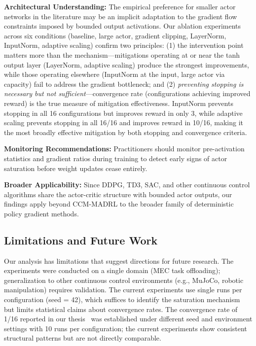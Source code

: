 \textbf{Architectural Understanding:} The empirical preference for smaller actor networks in the literature may be an implicit adaptation to the gradient flow constraints imposed by bounded output activations. Our ablation experiments across six conditions (baseline, large actor, gradient clipping, LayerNorm, InputNorm, adaptive scaling) confirm two principles: (1) the intervention point matters more than the mechanism---mitigations operating at or near the tanh output layer (LayerNorm, adaptive scaling) produce the strongest improvements, while those operating elsewhere (InputNorm at the input, large actor via capacity) fail to address the gradient bottleneck; and (2) \textit{preventing stopping is necessary but not sufficient}---convergence rate (configurations achieving improved reward) is the true measure of mitigation effectiveness. InputNorm prevents stopping in all 16 configurations but improves reward in only 3, while adaptive scaling prevents stopping in all 16/16 and improves reward in 10/16, making it the most broadly effective mitigation by both stopping and convergence criteria.

\textbf{Monitoring Recommendations:} Practitioners should monitor pre-activation statistics and gradient ratios during training to detect early signs of actor saturation before weight updates cease entirely.

\textbf{Broader Applicability:} Since DDPG, TD3, SAC, and other continuous control algorithms share the actor-critic structure with bounded actor outputs, our findings apply beyond CCM-MADRL to the broader family of deterministic policy gradient methods.

\subsection{Limitations and Future Work}

Our analysis has limitations that suggest directions for future research. The experiments were conducted on a single domain (MEC task offloading); generalization to other continuous control environments (e.g., MuJoCo, robotic manipulation) requires validation. The current experiments use single runs per configuration (seed = 42), which suffices to identify the saturation mechanism but limits statistical claims about convergence rates. The convergence rate of 1/16 reported in our thesis~\cite{gebrekidan2024thesis} was established under different seed and environment settings with 10 runs per configuration; the current experiments show consistent structural patterns but are not directly comparable.

